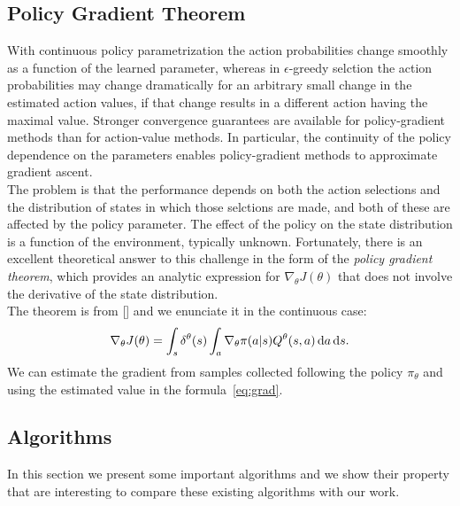 \subsection{Policy Gradient Theorem}
With continuous policy parametrization the action probabilities change smoothly as a function of the learned parameter, whereas in $\epsilon$-greedy selction the action probabilities may change dramatically for an arbitrary small change in the estimated action values, if that change results in a different action having the maximal value.
Stronger convergence guarantees are available for policy-gradient methods than for action-value methods. In particular, the continuity of the policy dependence on the parameters enables policy-gradient methods to approximate gradient ascent.\\
\newline
The problem is that the performance depends on both the action selections and the distribution of states in which those selctions are made, and both of these are affected by the policy parameter. The effect of the policy on the state distribution is a function of the environment, typically unknown. Fortunately, there is an excellent theoretical answer to this challenge in the form of the \emph{policy gradient theorem}, which provides an analytic expression for $\nabla_{\theta}J(\theta)$ that does not involve the derivative of the state distribution.\\
\newline
The theorem is from [\citet{Sutton1999PolicyGM}] and we enunciate it in the continuous case:
\begin{align}
\nabla_{\theta}J(\theta) = \int_s \delta^{\theta}(s) \int_a \nabla_{\theta} \pi(a|s) Q^{\theta}(s,a) \,\mathrm{d} a \,\mathrm{d} s. \label{eq:pgt}
\end{align}
We can estimate the gradient from samples collected following the policy $\pi_{\theta}$ and using the estimated value in the formula~\eqref{eq:grad}.

\subsection{Algorithms}
In this section we present some important algorithms and we show their property that are interesting to compare these existing algorithms with our work.
